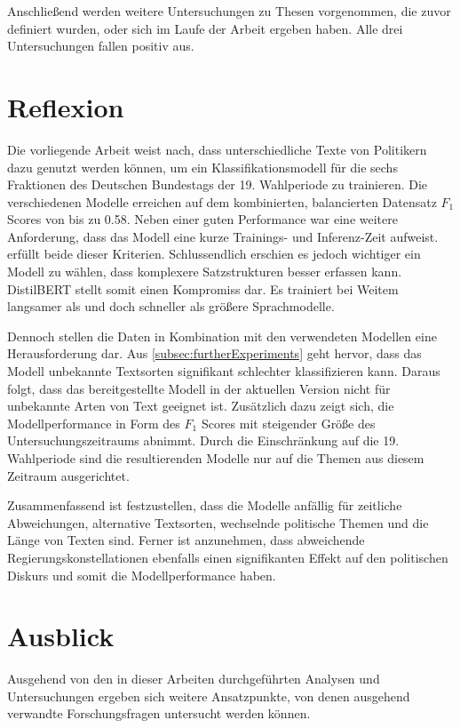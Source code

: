 Anschließend werden weitere Untersuchungen zu Thesen vorgenommen, die zuvor definiert wurden, oder sich im Laufe der Arbeit ergeben haben. Alle drei Untersuchungen fallen positiv aus.

\section{Reflexion}

Die vorliegende Arbeit weist nach, dass unterschiedliche Texte von Politikern dazu genutzt werden können, um ein Klassifikationsmodell für die sechs Fraktionen des Deutschen Bundestags der \num{19}. Wahlperiode zu trainieren. Die verschiedenen Modelle erreichen auf dem kombinierten, balancierten Datensatz \(F_1\) Scores von bis zu \num{0.58}. Neben einer guten Performance war eine weitere Anforderung, dass das Modell eine kurze Trainings- und Inferenz-Zeit aufweist. \ft erfüllt beide dieser Kriterien. Schlussendlich erschien es jedoch wichtiger ein Modell zu wählen, dass komplexere Satzstrukturen besser erfassen kann. DistilBERT stellt somit einen Kompromiss dar. Es trainiert bei Weitem langsamer als \ft und doch schneller als größere Sprachmodelle.

Dennoch stellen die Daten in Kombination mit den verwendeten Modellen eine Herausforderung dar. Aus \autoref{subsec:furtherExperiments} geht hervor, dass das Modell unbekannte Textsorten signifikant schlechter klassifizieren kann. Daraus folgt, dass das bereitgestellte Modell in der aktuellen Version nicht für unbekannte Arten von Text geeignet ist. Zusätzlich dazu zeigt sich, die Modellperformance in Form des \(F_1\) Scores mit steigender Größe des Untersuchungszeitraums abnimmt. Durch die Einschränkung auf die \num{19}. Wahlperiode sind die resultierenden Modelle nur auf die Themen aus diesem Zeitraum ausgerichtet.

Zusammenfassend ist festzustellen, dass die Modelle anfällig für zeitliche Abweichungen, alternative Textsorten, wechselnde politische Themen und die Länge von Texten sind. Ferner ist anzunehmen, dass abweichende Regierungskonstellationen ebenfalls einen signifikanten Effekt auf den politischen Diskurs und somit die Modellperformance haben.

\section{Ausblick}

Ausgehend von den in dieser Arbeiten durchgeführten Analysen und Untersuchungen ergeben sich weitere Ansatzpunkte, von denen ausgehend verwandte Forschungsfragen untersucht werden können.

